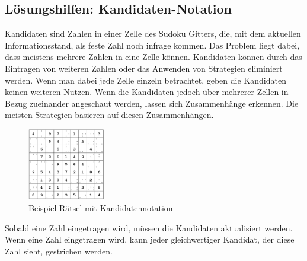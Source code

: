 \newpage

\subsection{Lösungshilfen: Kandidaten-Notation}
Kandidaten sind Zahlen in einer Zelle des Sudoku Gitters, die, mit dem aktuellen Informationsstand, als feste Zahl noch infrage kommen. Das Problem liegt dabei, dass meistens mehrere Zahlen in eine Zelle können. Kandidaten können durch das Eintragen von weiteren Zahlen oder das Anwenden von Strategien eliminiert werden. Wenn man dabei jede Zelle einzeln betrachtet, geben die Kandidaten keinen weiteren Nutzen. Wenn die Kandidaten jedoch über mehrerer Zellen in Bezug zueinander angeschaut werden, lassen sich Zusammenhänge erkennen. Die meisten Strategien basieren auf diesen Zusammenhängen. 

\begin{figure}[H]
	\centering
	\includegraphics[width=0.3\textwidth]{images/BeispielKandidatennotation.png}
	\caption{Beispiel Rätsel mit Kandidatennotation}
	\label{fig:SudokugitterKandidaten}
\end{figure}

Sobald eine Zahl eingetragen wird, müssen die Kandidaten aktualisiert werden. Wenn eine Zahl eingetragen wird, kann jeder gleichwertiger Kandidat, der diese Zahl sieht, gestrichen werden. \cite[85\psq]{althofer2014spiele} \cite{martin} \cite[4]{zambon2015sudoku}

